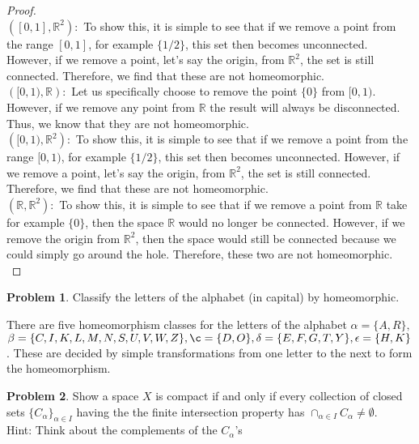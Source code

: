 \documentclass[11pt]{article}
\theoremstyle{definition}
\newtheorem{problem}{Problem}
\newcommand{\R}{\mathbb{R}}
\renewcommand{\a}{\alpha}
\renewcommand{\b}{\beta}
\renewcommand{\d}{\delta}
\newcommand{\e}{\epsilon}
\begin{document}
\begin{proof}
    \\
    $\left([0,1], \R^2\right):$ To show this, it is simple to see that if we remove a point from the range $[0, 1]$, for example $\{1/2\}$, this set then becomes unconnected. However, if we remove a point, let's say the origin, from $\R^2$, the set is still connected. Therefore, we find that these are not homeomorphic.
    \\
    $\left([0,1), \R\right):$ Let us specifically choose to remove the point $\{0\}$ from $[0, 1)$. However, if we remove any point from $\R$ the result will always be disconnected. Thus, we know that they are not homeomorphic.
    \\
    $\left([0,1), \R^2\right):$ To show this, it is simple to see that if we remove a point from the range $[0, 1)$, for example $\{1/2\}$, this set then becomes unconnected. However, if we remove a point, let's say the origin, from $\R^2$, the set is still connected. Therefore, we find that these are not homeomorphic.
    \\
    $\left(\R, \R^2\right):$ To show this, it is simple to see that if we remove a point from $\R$ take for example $\{0\}$, then the space $\R$ would no longer be connected. However, if we remove the origin from $\R^2$, then the space would still be connected because we could simply go around the hole. Therefore, these two are not homeomorphic.
    \\
\end{proof}

\pagebreak
\begin{problem}
    Classify the letters of the alphabet (in capital) by homeomorphic.
\end{problem}

There are five homeomorphism classes for the letters of the alphabet $\a = \{A, R\},$\\ $\b = \{C, I, K, L, M, N, S, U, V, W, Z\}, \c = \{D, O\}, \d = \{E, F, G, T, Y\}, \e = \{H, K\}$. These are decided by simple transformations from one letter to the next to form the homeomorphism.

\pagebreak
\begin{problem}
    Show a space $X$ is compact if and only if every collection of closed sets $\{C_\alpha\}_{\alpha \in I}$ having the the finite intersection property has $\cap_{\alpha \in I}C_\alpha \neq \emptyset$.\\
    Hint: Think about the complements of the $C_\alpha$'s
\end{problem}
\end{document}
